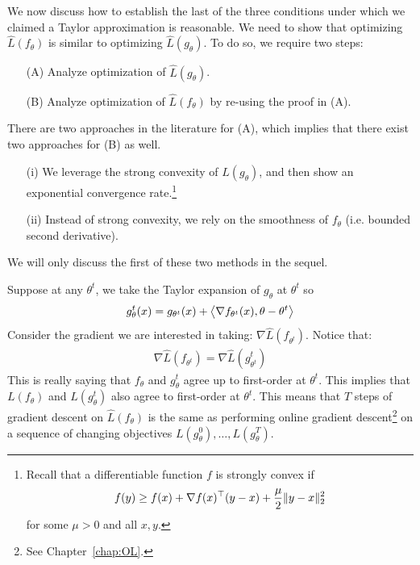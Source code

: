 We now discuss how to establish the last of the three conditions under which we claimed a Taylor approximation is reasonable. We need to show that  optimizing $\hat{L} (f_\theta)$ is similar to optimizing $\hat{L}(g_\theta)$. To do so, we require two steps:
\begin{enumerate}[label=\alph*]
    \item[(A)] Analyze optimization of $\hat{L}(g_\theta)$.
    \item[(B)] Analyze optimization of $\hat{L}(f_\theta)$ by re-using the proof in (A).
\end{enumerate}
There are two approaches in the literature for (A), which implies that there exist two approaches for (B) as well. 
\begin{enumerate}
    \item[(i)] We leverage the strong convexity of $\hat{L} (g_\theta)$, and then show an exponential convergence rate.\footnote{Recall that a differentiable function $f$ is strongly convex if 
    \begin{align} 
        f(y) \geq f(x) + \nabla f(x)^\top (y-x) + \frac{\mu}{2} \|y-x\|_2^2
    \end{align} for some $\mu>0$ and all $x,y$.} 
    \item[(ii)] Instead of strong convexity, we rely on the smoothness of $f_\theta$ (i.e. bounded second derivative). 
\end{enumerate}
We will only discuss the first of these two methods in the sequel.

\begin{remark} 
Suppose at any $\theta^t$, we take the Taylor expansion of $g_\theta$ at $\theta^t$ so 
\begin{align} 
    g_\theta^t(x) = g_{\theta^t} (x) + \left\langle \nabla f_{\theta^t} (x),\theta-\theta^t \right\rangle 
\end{align} 
Consider the gradient we are interested in taking: $\nabla \hat{L} ( f_{\theta^t})$. Notice that: \begin{align} 
    \nabla \hat{L} ( f_{\theta^t}) = \nabla \hat{L} ( g_{\theta^t}^t)
\end{align} 
This is really saying that $f_\theta$ and $g_\theta^t$ agree up to first-order at $\theta^t$. This implies that $L(f_\theta)$ and $L(g_\theta^t)$ also agree to first-order at $\theta^t$. This means that $T$ steps of gradient descent on $\hat{L}(f_\theta)$ is the same as performing online gradient descent\footnote{See Chapter~\ref{chap:OL}.} on a sequence of changing objectives $L(g_\theta^0), \ldots, L(g_\theta^T)$.
\end{remark} 

